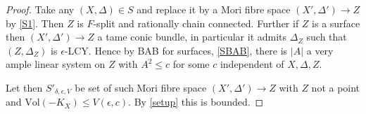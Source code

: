 \documentclass[a4paper,12pt]{book}
\newcommand{\Vol}{\text{Vol}}
\begin{document}
%
\begin{proof}
	Take any $(X,\Delta)\in S$ and replace it by a Mori fibre space $(X',\Delta') \to Z$ by \autoref{S1}. Then $Z$ is $F$-split and rationally chain connected. Further if $Z$ is a surface then $(X',\Delta')\to Z$ a tame conic bundle, in particular it admits $\Delta_{Z}$ such that $(Z,\Delta_{Z})$ is $\epsilon$-LCY. Hence by BAB for surfaces, \autoref{SBAB}, there is $|A|$ a very ample linear system on $Z$ with $A^{2}\leq c$ for some $c$ independent of $X,\Delta,Z$. 
	
	Let then $S'_{\delta,\epsilon,V}$ be set of such Mori fibre space $(X',\Delta') \to Z$ with $Z$ not a point and $\Vol(-K_{X})\leq V(\epsilon,c)$. By \autoref{setup} this is bounded.	
	\end{proof}



	
	
\end{document}
